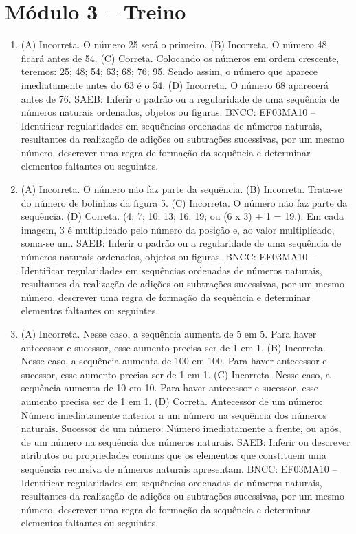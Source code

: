 \section*{Módulo 3 -- Treino}

\begin{enumerate}
\item
(A) Incorreta. O número 25 será o primeiro.
(B) Incorreta. O número 48 ficará antes de 54.
(C) Correta. Colocando os números em ordem crescente, teremos: 25; 48; 54; 63; 68; 76; 95. Sendo assim, o número que aparece imediatamente antes do 63 é o 54.
(D) Incorreta. O número 68 aparecerá antes de 76.
SAEB: Inferir o padrão ou a regularidade de uma sequência de números naturais ordenados, objetos ou figuras.
BNCC: EF03MA10 -- Identificar regularidades em sequências ordenadas de números naturais,
resultantes da realização de adições ou subtrações sucessivas, por um mesmo número,
descrever uma regra de formação da sequência e determinar elementos faltantes ou seguintes.

\item
(A) Incorreta. O número não faz parte da sequência.
(B) Incorreta. Trata-se do número de bolinhas da figura 5.
(C) Incorreta. O número não faz parte da sequência.
(D) Correta. (4; 7; 10; 13; 16; 19; ou (6 x 3) + 1 = 19.). Em cada imagem, 3 é multiplicado pelo número da posição e, ao valor multiplicado, soma-se um.
SAEB: Inferir o padrão ou a regularidade de uma sequência de números naturais ordenados, objetos ou figuras.
BNCC: EF03MA10 -- Identificar regularidades em sequências ordenadas de números naturais,
resultantes da realização de adições ou subtrações sucessivas, por um mesmo número,
descrever uma regra de formação da sequência e determinar elementos faltantes ou seguintes.

\item
(A) Incorreta. Nesse caso, a sequência aumenta de 5 em 5. Para haver antecessor e sucessor, esse aumento precisa ser de 1 em 1.
(B) Incorreta. Nesse caso, a sequência aumenta de 100 em 100. Para haver antecessor e sucessor, esse aumento precisa ser de 1 em 1.
(C) Incorreta. Nesse caso, a sequência aumenta de 10 em 10. Para haver antecessor e sucessor, esse aumento precisa ser de 1 em 1.
(D) Correta. Antecessor de um número: Número imediatamente anterior a um número na sequência dos números naturais. Sucessor de um número: Número imediatamente a frente, ou após, de um número na sequência dos números naturais.
SAEB: Inferir ou descrever atributos ou propriedades comuns que os elementos que constituem uma sequência recursiva de números naturais apresentam.
BNCC: EF03MA10 -- Identificar regularidades em sequências ordenadas de números naturais,
resultantes da realização de adições ou subtrações sucessivas, por um mesmo número,
descrever uma regra de formação da sequência e determinar elementos faltantes ou seguintes.
\end{enumerate}



